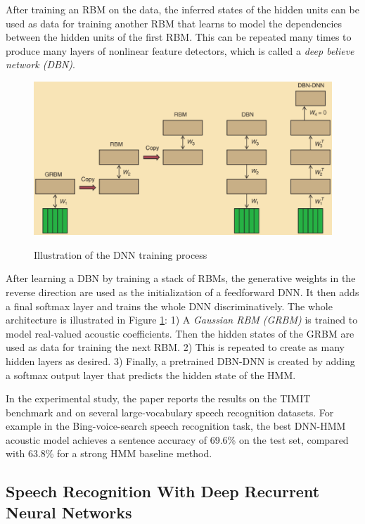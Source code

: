\documentclass[paper=a4, fontsize=18pt]{article} %
\numberwithin{equation}{section} %
\numberwithin{figure}{section} %
\numberwithin{table}{section} %
\begin{document}
After training an RBM on the data, the inferred states of the hidden units can be used as data for training another RBM that learns to model the dependencies between the hidden units of the first RBM. This can be repeated many times to produce many layers of nonlinear feature detectors, which is called a \emph{deep believe network (DBN)}.

\begin{figure}[htbp]
  \centering
  \includegraphics[width=.9\linewidth]{10_17_HMM_DNN}\\
  \caption{Illustration of the DNN training process}\label{fig:HMM_DNN}
\end{figure}

After learning a DBN by training a stack of RBMs, the generative weights in the reverse direction are used as the initialization of a feedforward DNN. It then adds a final softmax layer and trains the whole DNN discriminatively. The whole architecture is illustrated in Figure \ref{fig:HMM_DNN}: 1) A \emph{Gaussian RBM (GRBM)} is trained to model real-valued acoustic coefficients. Then the hidden states of the GRBM are used as data for training the next RBM. 2) This is repeated to create as many hidden layers as desired. 3) Finally, a pretrained DBN-DNN is created by adding a softmax output layer that predicts the hidden state of the HMM.

In the experimental study, the paper reports the results on the TIMIT benchmark and on several large-vocabulary speech recognition datasets. For example in the Bing-voice-search speech recognition task, the best DNN-HMM acoustic model achieves a sentence accuracy of 69.6\% on the test set, compared with 63.8\% for a strong HMM baseline method.

\subsection{Speech Recognition With Deep Recurrent Neural Networks \cite{Graves2013Speech}}
\end{document}
